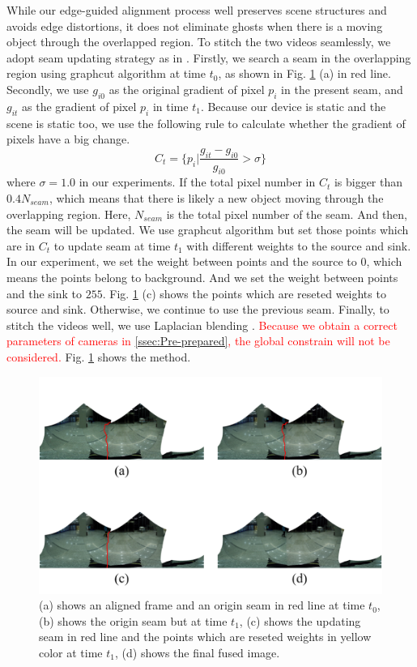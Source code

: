 \documentclass[conference]{IEEEtran}
\begin{document}
While our edge-guided alignment process well preserves scene structures and avoids edge distortions, it does not eliminate ghosts when there is a moving object through the overlapped region.
To stitch the two videos seamlessly, we adopt seam updating strategy as in \cite{he2016parallax}. 
Firstly, we search a seam in the overlapping region using graphcut algorithm \cite{boykov2004experimental} at time $t_0$, as shown in Fig. \ref{fig:p24} (a) in red line.
Secondly, we use $g_{i0}$ as the original gradient of pixel $p_i$ in the present seam, and $g_{it}$ as the gradient of pixel $p_i$ in time $t_1$. 
Because our device is static and the scene is static too, we use the following rule to calculate whether the gradient
of pixels have a big change.
\begin{equation}
\textit{C}_{t}=\{p_{i}|\frac{g_{it}-g_{i0}}{g_{i0}}>\sigma\}
\end{equation}
where $\sigma=1.0$ in our experiments.
If the total pixel number in $\textit{C}_t$ is bigger than $0.4N_{seam}$, which means that there is likely a new object moving through the overlapping region. 
Here, $N_{seam}$ is the total pixel number of the seam. 
And then, the seam will be updated. We use graphcut algorithm but set those points which are in $C_t$ to update seam at time $t_1$ with different weights to the source and sink. 
In our experiment, we set the weight between points and the source to $0$, which means the points belong to background. And we set the weight between points and the sink to $255$.
Fig. \ref{fig:p24} (c) shows the points which are reseted weights to source and sink.
Otherwise, we continue to use the previous seam.
Finally, to stitch the videos well, we use Laplacian blending \cite{burt1983laplacian}.
\textcolor{red}{Because we obtain a correct parameters of cameras in \ref{ssec:Pre-prepared}, the global constrain will not be considered.}
Fig. \ref{fig:p24} shows the method.
\begin{figure}[h]
\centering
\includegraphics[scale=0.52]{picture58.png}
\caption{(a) shows an aligned frame and an origin seam in red line at time $t_0$, (b) shows the origin seam but at time $t_1$, 
(c) shows the updating seam in red line and the points which are reseted weights in yellow color at time $t_1$, (d) shows the final fused image.}
\label{fig:p24}
\end{figure}
\end{document}
